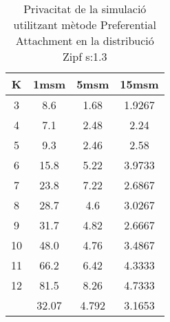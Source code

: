 \begin{table}[H]
\centering
\begin{tabular}{c|ccc}
K &1msm &5msm &15msm\\
\hline
3 & 8.6 & 1.68 & 1.9267\\
4 & 7.1 & 2.48 & 2.24\\
5 & 9.3 & 2.46 & 2.58\\
6 & 15.8 & 5.22 & 3.9733\\
7 & 23.8 & 7.22 & 2.6867\\
8 & 28.7 & 4.6 & 3.0267\\
9 & 31.7 & 4.82 & 2.6667\\
10 & 48.0 & 4.76 & 3.4867\\
11 & 66.2 & 6.42 & 4.3333\\
12 & 81.5 & 8.26 & 4.7333\\
\hline
& 32.07 & 4.792 & 3.1653\\
\end{tabular}
\caption{Privacitat de la simulació utilitzant mètode Preferential Attachment en la distribució Zipf s:1.3}
\label{tab:p13}
\end{table}

